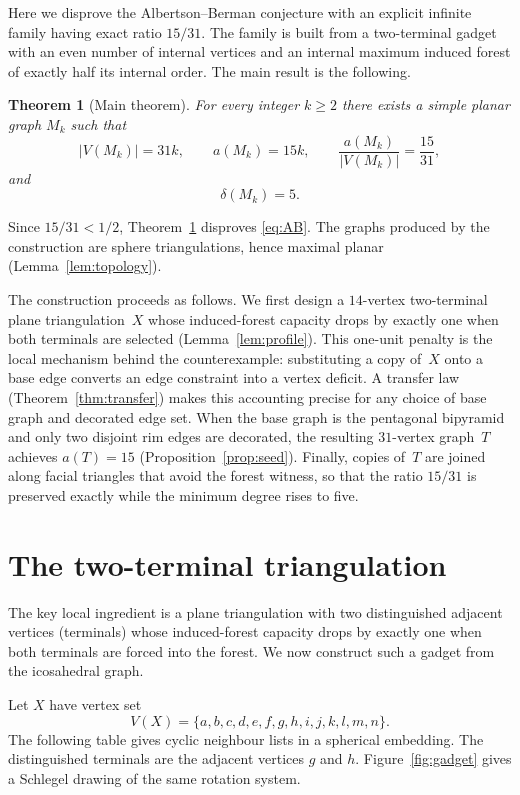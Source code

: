 \documentclass[11pt]{article}
\newtheorem{theorem}{Theorem}[section]
\theoremstyle{definition}
\theoremstyle{remark}
\begin{document}
Here we disprove the Albertson--Berman conjecture with an explicit infinite
family having exact ratio $15/31$.  The family is built from a two-terminal
gadget with an even number of internal vertices and an internal maximum induced
forest of exactly half its internal order.  The main result is the following.

\begin{theorem}[Main theorem]\label{thm:main}
For every integer $k\ge2$ there exists a simple planar graph $M_k$ such that
\[
 |V(M_k)|=31k,
 \qquad
 a(M_k)=15k,
 \qquad
 \frac{a(M_k)}{|V(M_k)|}=\frac{15}{31},
\]
and
\[
 \delta(M_k)=5.
\]
\end{theorem}

Since $15/31<1/2$, Theorem~\ref{thm:main} disproves \eqref{eq:AB}.
The graphs produced by the construction are sphere triangulations, hence
maximal planar (Lemma~\ref{lem:topology}).

The construction proceeds as follows.  We first design a $14$-vertex
two-terminal plane triangulation~$X$ whose induced-forest capacity drops by
exactly one when both terminals are selected
(Lemma~\ref{lem:profile}).  This one-unit penalty is the local mechanism
behind the counterexample: substituting a copy of~$X$ onto a base edge
converts an edge constraint into a vertex deficit.  A transfer law
(Theorem~\ref{thm:transfer}) makes this accounting precise for any choice of
base graph and decorated edge set.  When the base graph is the pentagonal
bipyramid and only two disjoint rim edges are decorated, the resulting
$31$-vertex graph~$T$ achieves $a(T)=15$
(Proposition~\ref{prop:seed}).  Finally, copies of~$T$ are joined along
facial triangles that avoid the forest witness, so that the ratio $15/31$
is preserved exactly while the minimum degree rises to five.

\section{The two-terminal triangulation}

The key local ingredient is a plane triangulation with
two distinguished adjacent vertices (terminals) whose induced-forest capacity
drops by exactly one when both terminals are forced into the forest. We now
construct such a gadget from the icosahedral graph.

Let $X$ have vertex set
\[
 V(X)=\{a,b,c,d,e,f,g,h,i,j,k,l,m,n\}.
\]
The following table gives cyclic neighbour lists in a spherical embedding.
The distinguished terminals are the adjacent vertices $g$ and $h$.
Figure~\ref{fig:gadget} gives a Schlegel drawing of the same rotation system.
\end{document}
